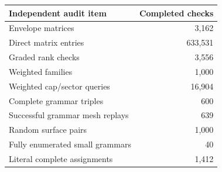 \begin{tabular}{lr}
\toprule
Independent audit item & Completed checks\\
\midrule
Envelope matrices & 3,162\\
Direct matrix entries & 633,531\\
Graded rank checks & 3,556\\
Weighted families & 1,000\\
Weighted cap/sector queries & 16,904\\
Complete grammar triples & 600\\
Successful grammar mesh replays & 639\\
Random surface pairs & 1,000\\
Fully enumerated small grammars & 40\\
Literal complete assignments & 1,412\\
\bottomrule
\end{tabular}
